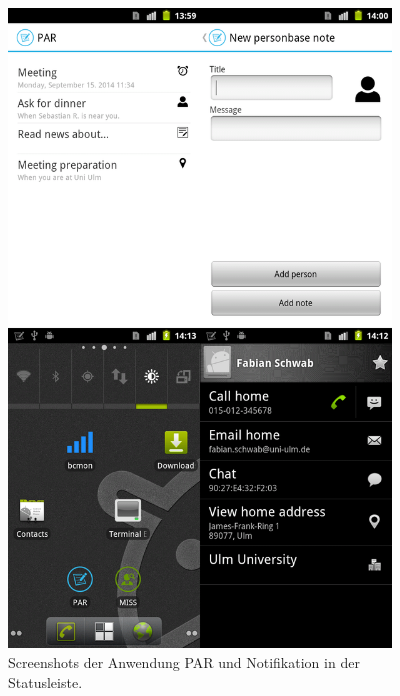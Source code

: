\documentclass[]{report}
\begin{document}
\begin{figure}[h!]
    \centering 
    \includegraphics[width=4.0in]{bilder/par.png}
    \caption{Screenshots der Anwendung PAR und Notifikation in der Statusleiste.}
    \label{fig:par}
\end{figure}
\end{document}
